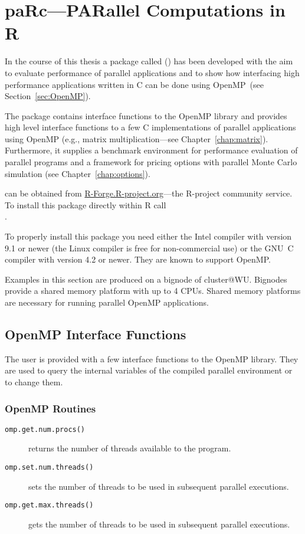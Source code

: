
\section{paRc---PARallel Computations in R}
\label{sec:paRc}

In the course of this thesis a package called 
(\cite{theussl07paRc}) has been developed with the aim
to evaluate performance of parallel applications and to show how
interfacing high performance applications written in C can be done
using OpenMP~(see Section~\ref{sec:OpenMP}).

The package  contains interface functions to the OpenMP library
and provides high level interface functions to a few C implementations
of parallel applications using OpenMP (e.g., matrix multiplication---see
Chapter~\ref{chap:matrix}).
Furthermore, it supplies a benchmark environment for performance
evaluation of parallel programs and a framework for pricing options
with parallel Monte Carlo simulation (see
Chapter~\ref{chap:options}).

 can be obtained from \url{R-Forge.R-project.org}---the
R-project community service. To install this package directly within R
call \\ .

To properly install this package you need either the Intel compiler
with version 9.1 or newer (the Linux compiler is free for
non-commercial use) or the GNU~C compiler with version 4.2 or
newer. They are known to support OpenMP.

Examples in this section are produced on a bignode of
cluster@WU. Bignodes provide a shared memory platform with up to 4
CPUs. Shared memory platforms are necessary for running parallel
OpenMP applications.

\subsection{OpenMP Interface Functions}

The user is provided with a few interface functions to the OpenMP
library. They are used to query the internal variables of the compiled
parallel environment or to change them.

\subsubsection{OpenMP Routines}
\begin{description}
\item[\texttt{omp.get.num.procs()}] returns the number of threads
  available to the program.
\item[\texttt{omp.set.num.threads()}] sets the number of threads to be
  used in subsequent parallel executions.
\item[\texttt{omp.get.max.threads()}] gets the number of threads to be
  used in subsequent parallel executions.
\end{description}


